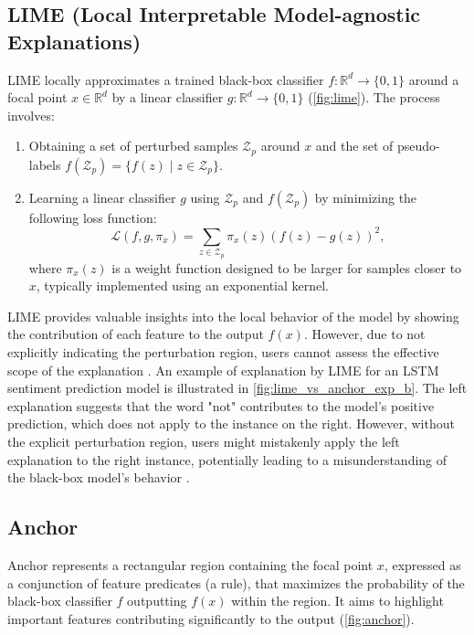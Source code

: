 \documentclass[runningheads]{llncs}
\begin{document}
\subsection{LIME (Local Interpretable Model-agnostic Explanations) \cite{ribeiro2016why}}
LIME locally
approximates a trained black-box classifier $f: \mathbb{R}^d \to \{0,1\}$
around a focal point $x \in \mathbb{R}^d$
by a linear classifier $g: \mathbb{R}^d \to \{0,1\}$
(\cref{fig:lime}).
The process involves:
\begin{enumerate}
	\item Obtaining a set of perturbed samples $\mathcal{Z}_p$ around $x$
	      and the set of pseudo-labels $f(\mathcal{Z}_p) = \{f(z) \mid z \in \mathcal{Z}_p\}$.
	\item Learning a linear classifier $g$
	      using $\mathcal{Z}_p$ and $f(\mathcal{Z}_p)$
	      by minimizing the following loss function:
	      \begin{equation}
		      \label{eq:lime_loss}
		      \mathcal{L}(f,g,\pi_x)=\sum_{z\in\mathcal{Z}_p}
		      \pi_x(z){\left(f(z)-g(z)\right)}^2,
	      \end{equation}
	      where $\pi_x(z)$ is a weight function designed to be larger for samples
	      closer to $x$, typically implemented using an exponential kernel.
\end{enumerate}

LIME provides valuable insights into the local behavior of the model
by showing the contribution of each feature to the output $f(x)$.
However, due to not explicitly indicating the perturbation region,
users cannot assess the effective scope of the explanation
\cite{ribeiro2018anchors}.
An example of explanation by LIME for an LSTM sentiment prediction model
is illustrated in \cref{fig:lime_vs_anchor_exp_b}.
The left explanation suggests that
the word "not" contributes to the model's positive prediction,
which does not apply to the instance on the right.
However, without the explicit perturbation region,
users might mistakenly apply the left explanation to the right instance,
potentially leading to a misunderstanding of the black-box model's behavior
\cite{ribeiro2018anchors}.

\subsection{Anchor \cite{ribeiro2018anchors}}\label{sec:anchor}
Anchor represents a rectangular region containing the focal point $x$,
expressed as a conjunction of feature predicates (a rule),
that maximizes the probability of the black-box classifier $f$
outputting $f(x)$ within the region.
It aims to highlight important features
contributing significantly to the output (\cref{fig:anchor}).
\end{document}

